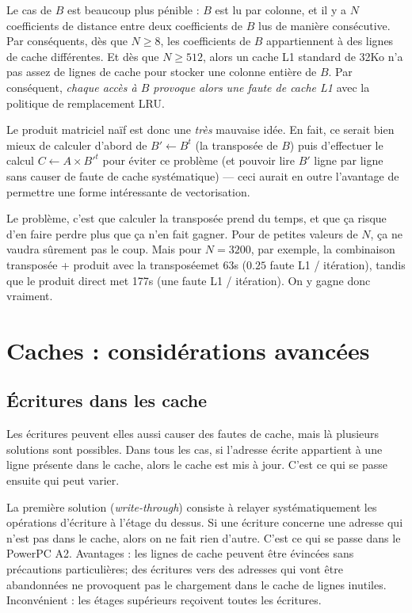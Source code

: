 Le cas de $B$ est beaucoup plus pénible : $B$ est lu par colonne, et il y a $N$
coefficients de distance entre deux coefficients de $B$ lus de manière
consécutive. Par conséquents, dès que $N \geq 8$, les coefficients de $B$
appartiennent à des lignes de cache différentes. Et dès que $N \geq 512$, alors
un cache L1 standard de 32Ko n'a pas assez de lignes de cache pour stocker une
colonne entière de $B$. Par conséquent, \emph{chaque accès à $B$ provoque alors
  une faute de cache L1} avec la politique de remplacement LRU.

Le produit matriciel naïf est donc une \emph{très} mauvaise idée. En fait, ce
serait bien mieux de calculer d'abord de $B' \gets B^t$ (la transposée de $B$)
puis d'effectuer le calcul $C \gets A \times {B'}^t$ pour éviter ce problème (et
pouvoir lire $B'$ ligne par ligne sans causer de faute de cache systématique)
--- ceci aurait en outre l'avantage de permettre une forme intéressante de
vectorisation.

Le problème, c'est que calculer la transposée prend du temps, et que ça risque
d'en faire perdre plus que ça n'en fait gagner. Pour de petites valeurs de $N$,
ça ne vaudra sûrement pas le coup. Mais pour $N=3200$, par exemple, la
combinaison \og transposée + produit avec la transposée\fg met 63s ($0.25$ faute
L1 / itération), tandis que le produit direct met 177s (une faute L1 /
itération). On y gagne donc vraiment.

\section{Caches : considérations avancées}

\subsection{Écritures dans les cache} Les écritures peuvent elles aussi causer
des fautes de cache, mais là plusieurs solutions sont possibles. Dans tous les
cas, si l'adresse écrite appartient à une ligne présente dans le cache, alors le
cache est mis à jour. C'est ce qui se passe ensuite qui peut varier.

La première solution (\og \emph{write-through}) consiste à relayer
systématiquement les opérations d'écriture à l'étage du dessus. Si une écriture
concerne une adresse qui n'est pas dans le cache, alors on ne fait rien d'autre.
C'est ce qui se passe dans le PowerPC A2. Avantages : les lignes de cache
peuvent être évincées sans précautions particulières; des écritures vers des
adresses qui vont être abandonnées ne provoquent pas le chargement dans le cache
de lignes inutiles. Inconvénient : les étages supérieurs reçoivent toutes les
écritures.

